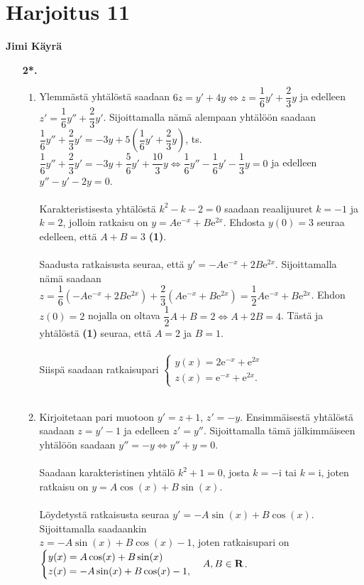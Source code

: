 \documentclass[12pt,fleqn]{article}
\begin{document}
\section*{Harjoitus 11}
\textbf{Jimi Käyrä}
\begin{enumerate}[label=\textbf{\arabic*.}]
\item [\textbf{2*.}]
\begin{enumerate}[label=\textbf{\alph*)}]
\item Ylemmästä yhtälöstä saadaan \(6z=y'+4y\iff z=\dfrac{1}{6}y'+\dfrac{2}{3}y\) ja edelleen \(z'=\dfrac{1}{6}y''+\dfrac{2}{3}y'\). Sijoittamalla nämä alempaan yhtälöön saadaan \(\dfrac{1}{6}y''+\dfrac{2}{3}y'=-3y+5\left (\dfrac{1}{6}y'+\dfrac{2}{3}y\right )\), ts. \(\dfrac{1}{6}y''+\dfrac{2}{3}y'=-3y+\dfrac{5}{6}y'+\dfrac{10}{3}y\iff \dfrac{1}{6}y''-\dfrac{1}{6}y'-\dfrac{1}{3}y=0\) ja edelleen \(y''-y'-2y=0\).\\
 \\
Karakteristisesta yhtälöstä \(k^2-k-2=0\) saadaan reaalijuuret \(k=-1\) ja \(k=2\), jolloin ratkaisu on \(y=A\text{e}^{-x}+B\text{e}^{2x}\). Ehdosta \(y(0)=3\) seuraa edelleen, että \(A+B=3\)  \textbf{(1)}.\\
 \\
Saadusta ratkaisusta seuraa, että \(y'=-A\text{e}^{-x}+2B\text{e}^{2x}\). Sijoittamalla nämä saadaan \(z=\dfrac{1}{6}\left (-A\text{e}^{-x}+2B\text{e}^{2x}\right )+\dfrac{2}{3}\left (A\text{e}^{-x}+B\text{e}^{2x}\right )=\dfrac{1}{2}A\text{e}^{-x}+B\text{e}^{2x}\). Ehdon \(z(0)=2\) nojalla on oltava \(\dfrac{1}{2}A+B=2\iff A+2B=4\). Tästä ja yhtälöstä \textbf{(1)} seuraa, että \(A=2\) ja \(B=1\).\\
 \\
Siispä saadaan ratkaisupari \(\begin{cases} y(x)=2\text{e}^{-x}+\text{e}^{2x} \\ z(x)=\text{e}^{-x}+\text{e}^{2x}. \end{cases}\) \\
 \\  

\item Kirjoitetaan pari muotoon \(y'=z+1\), \(z'=-y\). Ensimmäisestä yhtälöstä saadaan \(z=y'-1\) ja edelleen \(z'=y''\). Sijoittamalla tämä jälkimmäiseen yhtälöön saadaan \(y''=-y\iff y''+y=0\).\\
 \\
Saadaan karakteristinen yhtälö \(k^2+1=0\), josta \(k=-\text{i}\) tai \(k=\text{i}\), joten ratkaisu on \(y=A\cos (x)+B\sin (x)\).\\
 \\
Löydetystä ratkaisusta seuraa \(y'=-A\sin (x)+B\cos (x)\). Sijoittamalla saadaankin \\ \(z=-A\sin (x)+B\cos (x)-1\), joten ratkaisupari on \(\begin{cases} y(x)=A\cos (x)+B\sin (x) \\ z(x)=-A\sin (x)+B\cos (x)-1, \end{cases} \\A, B\in \mathbf{R}\).

\end{enumerate}
\end{enumerate}
\end{document}
